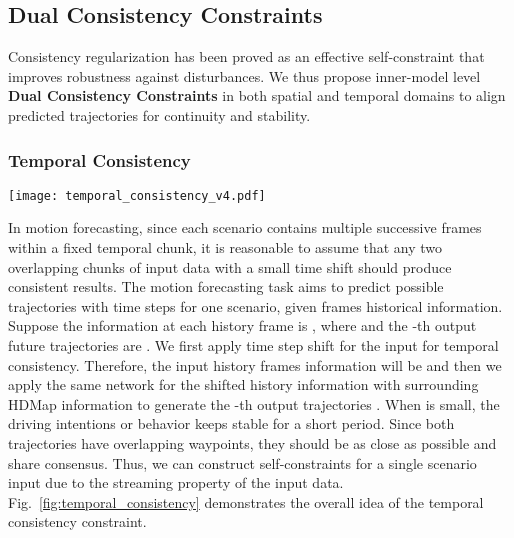 \documentclass[10pt,twocolumn,letterpaper]{article}
\begin{document}
\subsection{Dual Consistency Constraints}
Consistency regularization has been proved as an effective self-constraint that improves robustness against disturbances. We thus propose inner-model level \textbf{Dual Consistency Constraints} in both spatial and temporal domains to align predicted trajectories for continuity and stability.
\vspace{-4mm}
\subsubsection{Temporal Consistency}
\label{sec:temporal_consistency}
\begin{figure*}
    \centering
    \texttt{[image: temporal\_consistency\_v4.pdf]}
    \caption{The overall idea of the temporal consistency. In the training stage, we first generate output prediction trajectory points as normal for each given scenario. Then we slide the input with a step in order to introduce the streaming nature to generate the consecutive output trajectory points. The proposed temporal consistency requires the overlap between these two outputs to be consistent}
    \label{fig:temporal_consistency}
    \vspace{-5px}
\end{figure*}
In motion forecasting, since each scenario contains multiple successive frames within a fixed temporal chunk,
it is reasonable to assume that any two overlapping chunks of input data with a small time shift should produce consistent results. The motion forecasting task aims to predict  possible trajectories with  time steps for one scenario, given  frames historical information. Suppose the information at each history frame is , where  and the -th output future trajectories are . We first apply time step shift  for the input for temporal consistency. Therefore, the input history frames information will be  and then we apply the same network for the shifted history information with surrounding HDMap information to generate the -th output trajectories . When  is small, the driving intentions or behavior keeps stable for a short period. Since both trajectories have  overlapping waypoints, they should be as close as possible and share consensus. Thus, we can construct self-constraints for a single scenario input due to the streaming property of the input data. Fig.~\ref{fig:temporal_consistency} demonstrates the overall idea of the temporal consistency constraint.
\end{document}
